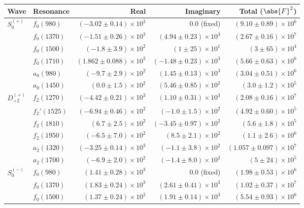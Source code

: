 \begin{table}[ht]
    \begin{center}
        \begin{tabular}{llrrr}\toprule
        Wave & Resonance & Real & Imaginary & Total ($\abs{F}^2$) \\\midrule
$S_{0}^{(+)}$ & $f_{0}(980)$ & $(-3.02 \pm 0.14) \times 10^{3}$ & $0.0$ (fixed) & $(9.10 \pm 0.89) \times 10^{6}$ \\
 & $f_{0}(1370)$ & $(-1.51 \pm 0.26) \times 10^{3}$ & $(4.94 \pm 0.23) \times 10^{3}$ & $(2.67 \pm 0.16) \times 10^{7}$ \\
 & $f_{0}(1500)$ & $(-1.8 \pm 3.9) \times 10^{2}$ & $(1 \pm 25) \times 10^{1}$ & $(3 \pm 65) \times 10^{4}$ \\
 & $f_{0}(1710)$ & $(1.862 \pm 0.088) \times 10^{3}$ & $(-1.48 \pm 0.23) \times 10^{3}$ & $(5.66 \pm 0.63) \times 10^{6}$ \\
 & $a_{0}(980)$ & $(-9.7 \pm 2.9) \times 10^{2}$ & $(1.45 \pm 0.13) \times 10^{3}$ & $(3.04 \pm 0.51) \times 10^{6}$ \\
 & $a_{0}(1450)$ & $(0.0 \pm 1.5) \times 10^{2}$ & $(5.46 \pm 0.85) \times 10^{2}$ & $(3.0 \pm 1.2) \times 10^{5}$ \\
$D_{+2}^{(+)}$ & $f_{2}(1270)$ & $(-4.42 \pm 0.21) \times 10^{3}$ & $(1.10 \pm 0.31) \times 10^{3}$ & $(2.08 \pm 0.16) \times 10^{7}$ \\
 & $f_{2}'(1525)$ & $(-6.94 \pm 0.46) \times 10^{2}$ & $(-1.0 \pm 1.5) \times 10^{2}$ & $(4.92 \pm 0.60) \times 10^{5}$ \\
 & $f_{2}(1810)$ & $(6.7 \pm 2.5) \times 10^{2}$ & $(-3.45 \pm 0.97) \times 10^{2}$ & $(5.6 \pm 1.8) \times 10^{5}$ \\
 & $f_{2}(1950)$ & $(-6.5 \pm 7.0) \times 10^{2}$ & $(8.5 \pm 2.1) \times 10^{2}$ & $(1.1 \pm 2.6) \times 10^{6}$ \\
 & $a_{2}(1320)$ & $(-3.25 \pm 0.14) \times 10^{3}$ & $(-1.1 \pm 3.8) \times 10^{2}$ & $(1.057 \pm 0.097) \times 10^{7}$ \\
 & $a_{2}(1700)$ & $(-6.9 \pm 2.0) \times 10^{2}$ & $(-1.4 \pm 8.0) \times 10^{2}$ & $(5 \pm 24) \times 10^{5}$ \\
$S_{0}^{(-)}$ & $f_{0}(980)$ & $(1.41 \pm 0.28) \times 10^{3}$ & $0.0$ (fixed) & $(1.98 \pm 0.53) \times 10^{6}$ \\
 & $f_{0}(1370)$ & $(1.83 \pm 0.24) \times 10^{3}$ & $(2.61 \pm 0.41) \times 10^{3}$ & $(1.02 \pm 0.37) \times 10^{7}$ \\
 & $f_{0}(1500)$ & $(1.37 \pm 0.24) \times 10^{3}$ & $(1.91 \pm 0.14) \times 10^{3}$ & $(5.54 \pm 0.93) \times 10^{6}$ \\

\end{tabular}
\end{center}
\end{table}

